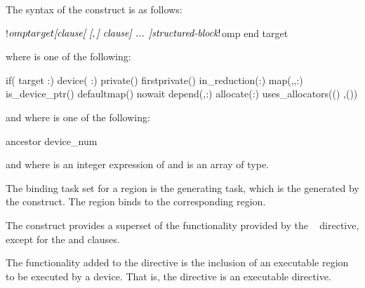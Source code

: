 \begin{samepage}
\smallskip
\begin{fortranspecific}
The syntax of the  construct is as follows:

\begin{ompfPragma}
!$omp target \plc{[clause[ [},\plc{] clause] ... ]}
    \plc{structured-block}
!$omp end target
\end{ompfPragma}

where  is one of the following:

\begin{indentedcodelist}
if(\plc{[} target :\plc{] scalar-logical-expression})
device(\plc{[ device-modifier} :\plc{] scalar-integer-expression})
private()
firstprivate()
in_reduction(:)
map(\plc{[[map-type-modifier[},\plc{] [map-type-modifier[},\plc{] ...] map-type}:\plc{ ] locator-list})
is_device_ptr()
defaultmap()
nowait
depend(\plc{[depend-modifier},\plc{] dependence-type }:)
allocate(\plc{[allocator}:\plc{]list})
uses_allocators(\plc{allocator[}()\plc{]}
	       \plc{[},\plc{allocator[}()\plc{] ...]})
\end{indentedcodelist}

and where  is one of the following:
\begin{indentedcodelist}
ancestor
device_num
\end{indentedcodelist}

and where  is an integer expression of  
 and  is an array of 
 type.
\end{fortranspecific}

\end{samepage}

\binding
The binding task set for a  region is the generating task, which is 
the  generated by the  construct. The 
region binds to the corresponding  region.

\descr
The  construct provides a superset of the functionality provided by 
the ~ directive, except for the  and 
 clauses.

The functionality added to the  directive is the inclusion of an 
executable region to be executed by a device. That is, the  directive 
is an executable directive.

